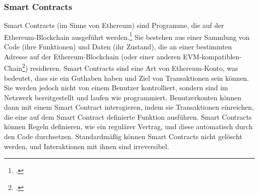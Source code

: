 \subsubsection{Smart Contracts}
\label{sec:definition-smart-contracts}

Smart Contracts (im Sinne von Ethereum) sind Programme, die auf der Ethereum-Blockchain ausgeführt werden.\footcite[Vgl. hierzu und im Folgenden][]{w4} 
Sie bestehen aus einer Sammlung von Code (ihre Funktionen) und Daten (ihr Zustand), die an einer bestimmten Adresse auf der Ethereum-Blockchain (oder einer anderen EVM-kompatiblen-Chain\footcite[Vgl.][]{w5}) residieren. %
Smart Contracts sind eine Art von Ethereum-Konto, was bedeutet, dass sie ein Guthaben haben und Ziel von Transaktionen sein können. 
Sie werden jedoch nicht von einem Benutzer kontrolliert, sondern sind im Netzwerk bereitgestellt und laufen wie programmiert. 
Benutzerkonten können dann mit einem Smart Contract interagieren, indem sie Transaktionen einreichen, die eine auf dem Smart Contract definierte Funktion ausführen. 
Smart Contracts können Regeln definieren, wie ein regulärer Vertrag, und diese automatisch durch den Code durchsetzen. Standardmäßig können Smart Contracts nicht gelöscht werden, und Interaktionen mit ihnen sind irreversibel.

